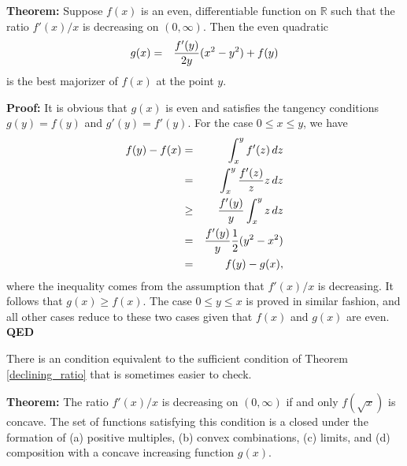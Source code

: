 \documentclass[
  12pt,
]{book}
\begin{document}
\textbf{Theorem:}
Suppose \(f(x)\) is an even, differentiable function on \(\mathbb{R}\) such that the ratio \(f'(x)/x\) is decreasing on \((0,\infty)\).
Then the even quadratic
\begin{eqnarray*}
g(x) & = & {f'(y) \over 2y}(x^2-y^2)+f(y)
\end{eqnarray*}
is the best majorizer of \(f(x)\) at the point \(y\).

\textbf{Proof:} It is obvious that \(g(x)\) is even and satisfies the
tangency conditions \(g(y)=f(y)\) and \(g'(y)=f'(y)\). For the case \(0 \le x \le y\), we have
\begin{eqnarray*}
f(y)-f(x) & = & \int_x^y f'(z)\, dz \\
& = & \int_x^y {f'(z) \over z} z \, dz \\
& \ge & {f'(y) \over y} \int_x^y z \, dz \\
& = & {f'(y) \over y}{1 \over 2}(y^2-x^2) \\
& = & f(y) -g(x),
\end{eqnarray*}
where the inequality comes from the assumption that \(f'(x)/x\) is decreasing.
It follows that \(g(x) \ge f(x)\). The case \(0 \le y \le x\)
is proved in similar fashion, and all other cases reduce to
these two cases given that \(f(x)\) and \(g(x)\) are even.
\textbf{QED}

There is an condition equivalent to the sufficient condition of Theorem
\ref{declining_ratio} that is sometimes easier to check.

\textbf{Theorem:}
The ratio \(f'(x)/x\) is decreasing on \((0,\infty)\)
if and only \(f(\sqrt{x})\) is concave. The set of functions satisfying
this condition is a closed under the formation of (a) positive multiples,
(b) convex combinations, (c) limits, and (d) composition with a
concave increasing function \(g(x)\).
\end{document}

